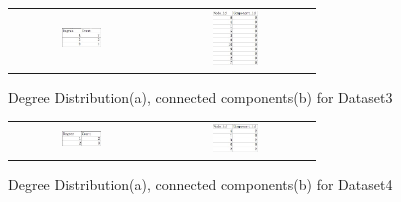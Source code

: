 \begin{figure}[H]
\begin{center}
\begin{tabular}{cc}
     \includegraphics[width=0.3\textwidth]{FIG/3dd.jpg} &
     \includegraphics[width=0.3\textwidth]{FIG/3cc.jpg} \\
\end{tabular}
\caption{Degree Distribution(a), connected components(b) for Dataset3}
\end{center}
\end{figure}

\begin{figure}[H]
\begin{center}
\begin{tabular}{cc}
     \includegraphics[width=0.3\textwidth]{FIG/4dd.jpg} &
     \includegraphics[width=0.3\textwidth]{FIG/4cc.jpg} \\
\end{tabular}
\caption{Degree Distribution(a), connected components(b) for Dataset4}
\end{center}
\end{figure}

